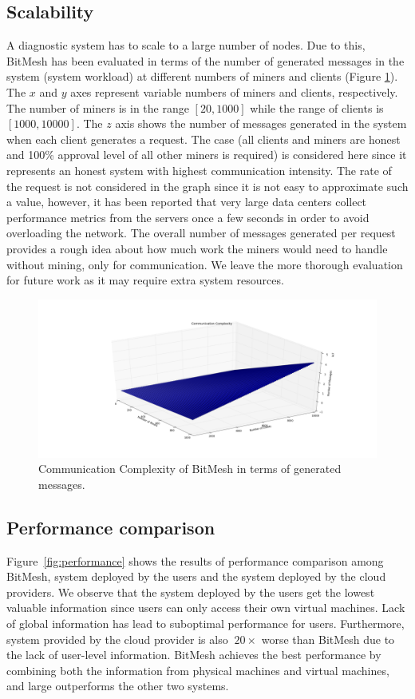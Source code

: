 \documentclass[11px]{article}
\newcommand{\projTitle}{BitMesh\xspace}
\begin{document}
\subsection{Scalability}
\label{ssec:eval_scalability}
A diagnostic system has to scale to a large number of nodes. Due to this, \projTitle has been evaluated in terms of the number of generated messages in the system (system workload) at different numbers of miners and clients (Figure \ref{fig:complexity_measure}). The $x$ and $y$ axes represent variable numbers of miners and clients, respectively. The number of miners is in the range $[20,1000]$ while the range of clients is $[1000,10000]$. The $z$ axis shows the number of messages generated in the system when each client generates a request. The case (all clients and miners are honest and 100\% approval level of all other miners is required) is considered here since it represents an honest system with highest communication intensity. The rate of the request is not considered in the graph since it is not easy to approximate such a value, however, it has been reported that very large data centers collect performance metrics from the servers once a few seconds \cite{microsoft-autopilot} in order to avoid overloading the network. The overall number of messages generated per request provides a rough idea about how much work the miners would need to handle without mining, only for communication. We leave the more thorough evaluation for future work as it may require extra system resources.

\begin{figure}[h]
\centering
\includegraphics[width=0.8\linewidth]{figures/complexity_of_communication.png}
\caption{Communication Complexity of \projTitle in terms of generated messages.}
\label{fig:complexity_measure}
\center
\end{figure}

\subsection{Performance comparison}
Figure~\ref{fig:performance} shows the results of performance comparison among \projTitle, system deployed by the users and the system deployed by the cloud providers. We observe that the system deployed by the users get the lowest valuable information since users can only access their own virtual machines. Lack of global information has lead to suboptimal performance for users. Furthermore, system provided by the cloud provider is also $~20\times$ worse than \projTitle due to the lack of user-level information. \projTitle achieves the best performance by combining both the information from physical machines and virtual machines, and large outperforms the other two systems.
\end{document}
